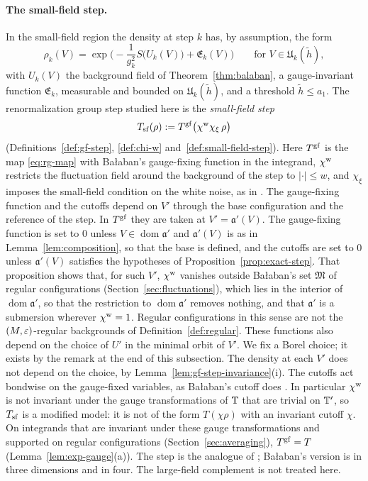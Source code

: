 \paragraph{The small-field step.} In the small-field region the density at step $k$ has, by assumption, the form
\begin{equation}\label{eq:rho-form}
\rho_k(V)=\exp\Big(-\frac1{g_k^2}S\big(U_k(V)\big)+\mathfrak E_k(V)\Big)\qquad\text{for }V\in\mathfrak U_k(\tilde h),
\end{equation}
with $U_k(V)$ the background field of Theorem~\ref{thm:balaban}, a gauge-invariant function $\mathfrak E_k$, measurable and bounded on $\mathfrak U_k(\tilde h)$, and a threshold $\tilde h\le a_1$. The renormalization group step studied here is the \emph{small-field step}
\[
T_{\rm sf}(\rho):=T^{\rm gf}\big(\chi^{\rm w}\chi_\xi\,\rho\big)
\]
(Definitions~\ref{def:gf-step}, \ref{def:chi-w} and~\ref{def:small-field-step}). Here $T^{\rm gf}$ is the map \eqref{eq:rg-map} with Ba\l aban's gauge-fixing function in the integrand, $\chi^{\rm w}$ restricts the fluctuation field around the background of the step to $|\cdot|\le w$, and $\chi_\xi$ imposes the small-field condition on the white noise, as in \cite[(206)]{DimockI}. The gauge-fixing function and the cutoffs depend on $V'$ through the base configuration and the reference of the step. In $T^{\rm gf}$ they are taken at $V'=\mathfrak a'(V)$. The gauge-fixing function is set to $0$ unless $V\in\operatorname{dom}\mathfrak a'$ and $\mathfrak a'(V)$ is as in Lemma~\ref{lem:composition}, so that the base is defined, and the cutoffs are set to $0$ unless $\mathfrak a'(V)$ satisfies the hypotheses of Proposition~\ref{prop:exact-step}. That proposition shows that, for such $V'$, $\chi^{\rm w}$ vanishes outside Ba\l aban's set $\mathfrak M$ of regular configurations (Section~\ref{sec:fluctuations}), which lies in the interior of $\operatorname{dom}\mathfrak a'$, so that the restriction to $\operatorname{dom}\mathfrak a'$ removes nothing, and that $\mathfrak a'$ is a submersion wherever $\chi^{\rm w}=1$. Regular configurations in this sense are not the $(M,\varepsilon)$-regular backgrounds of Definition~\ref{def:regular}. These functions also depend on the choice of $U'$ in the minimal orbit of $V'$. We fix a Borel choice; it exists by the remark at the end of this subsection. The density at each $V'$ does not depend on the choice, by Lemma~\ref{lem:gf-step-invariance}(i). The cutoffs act bondwise on the gauge-fixed variables, as Ba\l aban's cutoff does \cite[(2.9), (2.10)]{BalYM4I}. In particular $\chi^{\rm w}$ is not invariant under the gauge transformations of $\mathbb T$ that are trivial on $\mathbb T'$, so $T_{\rm sf}$ is a modified model: it is not of the form $T(\chi\rho)$ with an invariant cutoff $\chi$. On integrands that are invariant under these gauge transformations and supported on regular configurations (Section~\ref{sec:averaging}), $T^{\rm gf}=T$ (Lemma~\ref{lem:exp-gauge}(a)). The step is the analogue of \cite[(172), (206)]{DimockI}; Ba\l aban's version is \cite[(7)--(13)]{BalUV3} in three dimensions and \cite[(2.9), (2.10)]{BalYM4I} in four. The large-field complement is not treated here.

